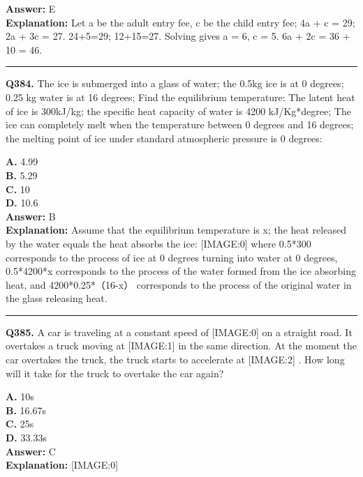 \documentclass[12pt]{article}
\begin{document}
\textbf{Answer:} E \\
\textbf{Explanation:} Let a be the adult entry fee, c be the child entry fee;
4a + c = 29; 2a + 3c = 27.
24+5=29; 12+15=27.
Solving gives a = 6, c = 5.
6a + 2c = 36 + 10 = 46.

\hrule
\vspace{1em}


\noindent
\textbf{Q384.} The ice is submerged into a glass of water; the 0.5kg ice is at 0 degrees; 0.25 kg water is at 16 degrees; Find the equilibrium temperature: The latent heat of ice is 300kJ/kg; the specific heat capacity of water is 4200 kJ/Kg*degree; The ice can completely melt when the temperature between 0 degrees and 16 degrees; the melting point of ice under standard atmospheric pressure is 0 degrees:



\textbf{A.} 4.99 \\
\textbf{B.} 5.29 \\
\textbf{C.} 10 \\
\textbf{D.} 10.6 \\

\textbf{Answer:} B \\
\textbf{Explanation:} Assume that the equilibrium temperature is x; the heat released by the water equals the heat absorbs the ice:
[IMAGE:0]
where 0.5*300
corresponds to the process of ice at 0 degrees turning into water at 0 degrees, 0.5*4200*x
corresponds to the process of the water formed from the ice absorbing heat, and 4200*0.25*（16-x）
corresponds to the process of the original water in the glass releasing heat.

\hrule
\vspace{1em}


\noindent
\textbf{Q385.} A car is traveling at a constant speed of
[IMAGE:0]
on a straight road. It overtakes a truck moving at
[IMAGE:1]
in the same direction. At the moment the car overtakes the truck, the truck starts to accelerate at
[IMAGE:2]
. How long will it take for the truck to overtake the car again?



\textbf{A.} 10s \\
\textbf{B.} 16.67s \\
\textbf{C.} 25s \\
\textbf{D.} 33.33s \\

\textbf{Answer:} C \\
\textbf{Explanation:} [IMAGE:0]
\end{document}
